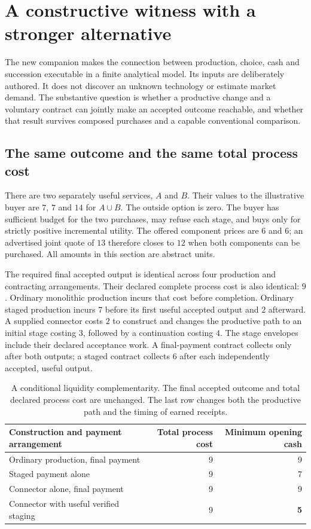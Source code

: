 \section{A constructive witness with a stronger alternative}\label{sec:study}
The new companion makes the connection between production, choice, cash and succession executable in a finite analytical model. Its inputs are deliberately authored. It does not discover an unknown technology or estimate market demand. The substantive question is whether a productive change and a voluntary contract can jointly make an accepted outcome reachable, and whether that result survives composed purchases and a capable conventional comparison.

\subsection{The same outcome and the same total process cost}
There are two separately useful services, $A$ and $B$. Their values to the illustrative buyer are $7$, $7$ and $14$ for $A\cup B$. The outside option is zero. The buyer has sufficient budget for the two purchases, may refuse each stage, and buys only for strictly positive incremental utility. The offered component prices are $6$ and $6$; an advertised joint quote of $13$ therefore closes to $12$ when both components can be purchased. All amounts in this section are abstract units.

The required final accepted output is identical across four production and contracting arrangements. Their declared complete process cost is also identical: $9$. Ordinary monolithic production incurs that cost before completion. Ordinary staged production incurs $7$ before its first useful accepted output and $2$ afterward. A supplied connector costs $2$ to construct and changes the productive path to an initial stage costing $3$, followed by a continuation costing $4$. The stage envelopes include their declared acceptance work. A final-payment contract collects only after both outputs; a staged contract collects $6$ after each independently accepted, useful output.

\begin{table}[ht]
\small\centering
\begin{tabularx}{\linewidth}{@{}Yrr@{}}\toprule
Construction and payment arrangement & Total process cost & Minimum opening cash\\\midrule
Ordinary production, final payment & 9 & 9\\
Staged payment alone & 9 & 7\\
Connector alone, final payment & 9 & 9\\
Connector with useful verified staging & 9 & \textbf{5}\\\bottomrule
\end{tabularx}
\caption{A conditional liquidity complementarity. The final accepted outcome and total declared process cost are unchanged. The last row changes both the productive path and the timing of earned receipts.}
\label{tab:stages}
\end{table}

